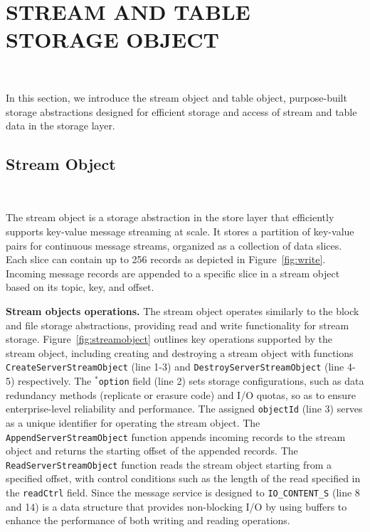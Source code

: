 \section{STREAM AND TABLE STORAGE OBJECT} 
~\label{sec:datagen}

In this section, we introduce the stream object and table object, purpose-built storage abstractions designed for efficient storage and access of stream and table data in the storage layer.


\subsection{Stream Object}~\label{subsec:streamobject}

The stream object is a storage abstraction in the store layer that efficiently supports key-value message streaming at scale. It stores a partition of key-value pairs for continuous message streams, organized as a collection of data slices. Each slice can contain up to 256 records as depicted in Figure~\ref{fig:write}. Incoming message records are appended  to a specific slice in a stream object based on its topic, key, and offset.

\noindent \textbf{Stream objects operations.} The stream object operates similarly to the block and file storage abstractions, providing read and write functionality for stream storage. Figure~\ref{fig:streamobject} outlines key operations supported by the stream object, including creating and destroying a stream object with  functions \texttt{CreateServerStreamObject} (line 1-3) and \texttt{DestroyServerStreamObject} (line 4-5) respectively. The \texttt{$^*$option} field (line 2) sets storage configurations, such as data redundancy methods (replicate or erasure code) and I/O quotas, so as to ensure enterprise-level reliability and performance. The assigned \texttt{objectId} (line 3) serves as a unique identifier for operating the stream object. The \texttt{AppendServerStreamObject} function appends incoming records  to the stream object and returns the starting offset of the appended records. The \texttt{ReadServerStreamObject} function reads the stream object starting from a specified offset, with control conditions such as the length of the read specified in the \texttt{readCtrl} field. 
Since the message service is designed to  \texttt{IO\_CONTENT\_S} (line 8 and 14) is a data structure that provides non-blocking I/O by using buffers to enhance the performance of both writing and reading operations.


